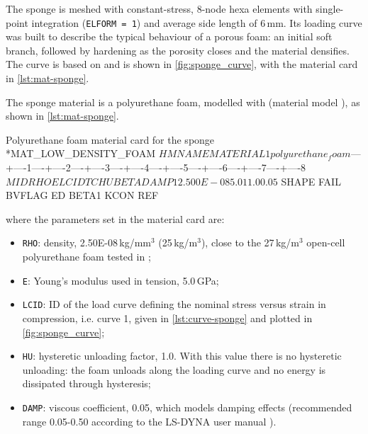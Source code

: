 The sponge is meshed with constant-stress, 8-node hexa elements with single-point integration (\texttt{ELFORM = 1}) and average side length of 6\,mm. Its loading curve was built to describe the typical behaviour of a porous foam: an initial soft branch, followed by hardening as the porosity closes and the material densifies. The curve is based on \cite{Croop2009} and is shown in \cref{fig:sponge_curve}, with the material card in \cref{lst:mat-sponge}.

The sponge material is a polyurethane foam, modelled with  (material model ), as shown in \cref{lst:mat-sponge}.

\begin{dynacard}[label=lst:mat-sponge]{Polyurethane foam material card for the sponge}
*MAT_LOW_DENSITY_FOAM
$HMNAME MATERIAL         1polyurethane_foam
$---+----1----+----2----+----3----+----4----+----5----+----6----+----7----+----8
$      MID       RHO         E      LCID        TC        HU      BETA      DAMP
         1 2.500E-08       5.0         1                 1.0                0.05
$    SHAPE      FAIL    BVFLAG        ED     BETA1      KCON       REF

\end{dynacard}

\noindent where the parameters set in the material card are:

\begin{itemize}
  \item \texttt{RHO}: density, 2.50E-08\,kg/mm$^3$ (25\,kg/m$^3$), close to the 27\,kg/m$^3$ open-cell polyurethane foam tested in \cite{Croop2009};
  \item \texttt{E}: Young's modulus used in tension, 5.0\,GPa;
  \item \texttt{LCID}: ID of the load curve defining the nominal stress versus strain in compression, i.e. curve 1, given in \cref{lst:curve-sponge} and plotted in \cref{fig:sponge_curve};
  \item \texttt{HU}: hysteretic unloading factor, 1.0. With this value there is no hysteretic unloading: the foam unloads along the loading curve and no energy is dissipated through hysteresis;
  \item \texttt{DAMP}: viscous coefficient, 0.05, which models damping effects (recommended range 0.05-0.50 according to the LS-DYNA user manual \cite[p.~453]{LSDYNA_KW_II}).
\end{itemize}

